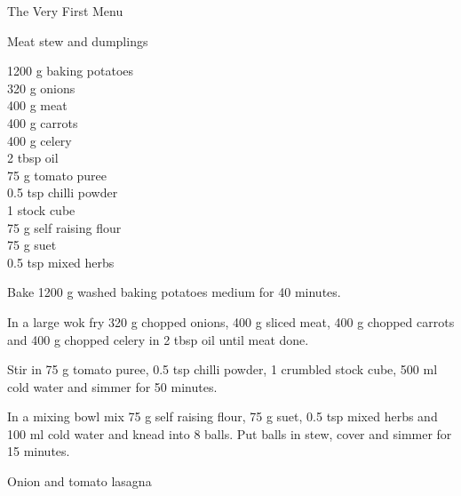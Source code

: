 \begin{menu}{The Very First Menu}
    \begin{recipe}{2}{Meat stew and dumplings}%
    
	
	
		\begin{ingredients}
		1200 g baking potatoes  \\
	320 g onions  \\
	400 g meat  \\
	400 g carrots  \\
	400 g celery  \\
	2 tbsp oil  \\
	75 g tomato puree  \\
	0.5 tsp chilli powder  \\
	1  stock cube  \\
	75 g self raising flour  \\
	75 g suet  \\
	0.5 tsp mixed herbs  \\
	
		\end{ingredients}
	
    \begin{instructions}
    \item 
      Bake 1200 g washed baking potatoes
      medium for 40 minutes.
    \item 
        In a large wok fry
        320 g chopped onions,
        400 g sliced meat,
        400 g chopped carrots
        and
        400 g chopped celery
        in
        2 tbsp  oil
        until meat done.
      \item 
        Stir in
        75 g  tomato puree,
        0.5 tsp  chilli powder,
        1  crumbled stock cube,
        500 ml  cold water
        and simmer for 50 minutes.
      \item 
        In a mixing bowl mix
        75 g  self raising flour,
        75 g  suet,
        0.5 tsp  mixed herbs
        and
        100 ml  cold water
        and knead into 8 balls.
        Put balls in stew, cover and
        simmer for 15 minutes.
      
    \end{instructions}
    \end{recipe}%
  
    \begin{recipe}{2}{Onion and tomato lasagna}%
    
	

\end{recipe}
\end{menu}
